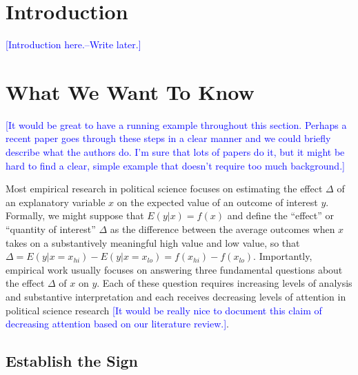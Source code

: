 \documentclass[12pt]{article}
\newcommand{\kelly}[1]{\textcolor{blue}{#1}}
\begin{document}

\newpage
\doublespace

\section*{Introduction}

\kelly{[Introduction here.--Write later.]}

\section*{What We Want To Know}

\kelly{[It would be great to have a running example throughout this section. Perhaps a recent paper goes through these steps in a clear manner and we could briefly describe what the authors do. I'm sure that lots of papers do it, but it might be hard to find a clear, simple example that doesn't require too much background.]}

Most empirical research in political science focuses on estimating the effect $\Delta$ of an explanatory variable $x$ on the expected value of an outcome of interest $y$. Formally, we might suppose that $E(y | x) = f(x)$ and define the ``effect'' or ``quantity of interest'' $\Delta$ as the difference between the average outcomes when $x$ takes on a substantively meaningful high value and low value, so that $\Delta = E(y | x = x_{hi}) - E(y | x = x_{lo}) = f(x_{hi}) - f(x_{lo})$. Importantly, empirical work usually focuses on answering three fundamental questions about the effect $\Delta$ of $x$ on $y$. Each of these question requires increasing levels of analysis and substantive interpretation and each receives decreasing levels of attention in political science research \kelly{[It would be really nice to document this claim of decreasing attention based on our literature review.]}.

\subsection*{Establish the Sign}
\end{document}
